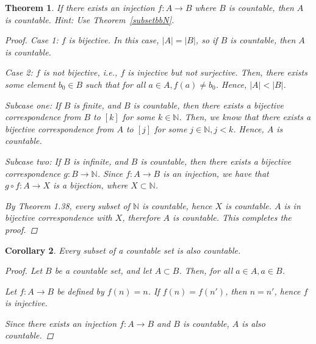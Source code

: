 \documentclass[11pt]{article}
\newcommand{\bbN}{\mathbb{N}}
\newtheorem{theorem}{Theorem}[section]
\newtheorem{corollary}[theorem]{Corollary}
\theoremstyle{definition}
\numberwithin{equation}{subsection}
\begin{document}
\begin{theorem}\label{injbbN}
  If there exists an injection $f:A\longrightarrow B$ where $B$ is countable, then $A$ is
  countable. {\it Hint: Use Theorem~\ref{subsetbbN}.}

\begin{proof}
Case 1: $f$ is bijective. In this case, $|A|=|B|$, so if $B$ is countable, then $A$ is countable.

Case 2: $f$ is not bijective, i.e., $f$ is injective but not surjective. Then, there exists some element $b_0 \in B$ such that for all $a \in A, f(a) \not = b_0$. Hence, $|A| < |B|$. 

Subcase one: If $B$ is finite, and $B$ is countable, then there exists a bijective correspondence from $B$ to $[k]$ for some $k \in \bbN$. Then, we know that there exists a bijective correspondence from $A$ to $[j]$ for some $j \in \bbN, j < k$. Hence, $A$ is countable.

Subcase two: If $B$ is infinite, and $B$ is countable, then there exists a bijective correspondence $g\colon B \rightarrow \bbN$. Since $f\colon A \rightarrow B$ is an injection, we have that $g \circ f \colon A \rightarrow X$ is a bijection, where $X \subset \bbN$. 

By Theorem 1.38, every subset of $\bbN$ is countable, hence $X$ is countable. $A$ is in bijective correspondence with $X$, therefore $A$ is countable. This completes the proof.

\renewcommand\qedsymbol{QED}
\end{proof}
\end{theorem}

\begin{corollary}
  Every subset of a countable set is also countable.

  

\begin{proof}
Let $B$ be a countable set, and let $A \subset B$. Then, for all $a \in A, a \in B$.

Let $f \colon A \rightarrow B$ be defined by $f(n)=n$. If $f(n)=f(n')$, then $n =n'$, hence $f$ is injective.

Since there exists an injection $f \colon A \rightarrow B$ and $B$ is countable, $A$ is also countable.



\renewcommand\qedsymbol{QED}
\end{proof}

\end{corollary}
\end{document}
